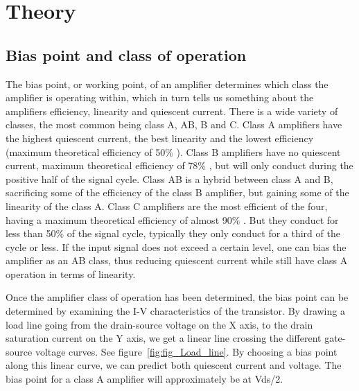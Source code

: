 \chapter{Theory}

\section{Bias point and class of operation}
The bias point, or working point, of an amplifier determines which class the amplifier is operating within, which in turn tells us something about the amplifiers efficiency, linearity and quiescent current. There is a wide variety of classes, the most common being class A, AB, B and C. 
Class A amplifiers have the highest quiescent current, the best linearity and the lowest efficiency (maximum theoretical efficiency of 50\% ). 
Class B amplifiers have no quiescent current, maximum theoretical efficiency of 78\% , but will only conduct during the positive half of the signal cycle. Class AB is a hybrid between class A and B, sacrificing some of the efficiency of the class B amplifier, but gaining some of the linearity of the class A. 
Class C amplifiers are the most efficient of the four, having a maximum theoretical efficiency of almost 90\% . But they conduct for less than 50\%  of the signal cycle, typically they only conduct for a third of the cycle or less.
If the input signal does not exceed a certain level, one can bias the amplifier as an AB class, thus reducing quiescent current while still have class A operation in terms of linearity.

Once the amplifier class of operation has been determined, the bias point can be determined by examining the I-V characteristics of the transistor. By drawing a load line going from the drain-source voltage on the X axis, to the drain saturation current on the Y axis, we get a linear line crossing the different gate-source voltage curves. See figure~\ref{fig:fig_Load_line}. By choosing a bias point along this linear curve, we can predict both quiescent current and voltage. The bias point for a class A amplifier will approximately be at Vds/2.

